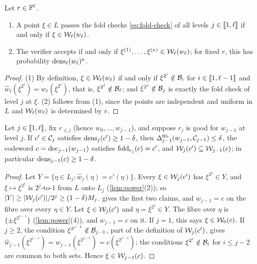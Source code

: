 \begin{lemma}\label{lem:passing}
Let $r \in \mathbb{F}^\ell$.
\begin{enumerate}
  \item A point $\xi \in L$ passes the fold checks \eqref{eq:fold-check} of all levels $j \in \llbracket 1, \ell \rrbracket$ if and only if $\xi \in \mathcal{W}_\ell(w_\ell)$.
  \item The verifier accepts if and only if $\xi^{(1)},\dots,\xi^{(\kappa)} \in \mathcal{W}_\ell(w_\ell)$; for fixed $r$, this has probability $\mathrm{dens}_\ell(w_\ell)^\kappa$.
\end{enumerate}
\end{lemma}

\begin{proof}
(1) By definition, $\xi \in \mathcal{W}_\ell(w_\ell)$ if and only if $\xi^{2^i} \notin \mathcal{B}_i$ for $i \in \llbracket 1, \ell-1 \rrbracket$ and $\hat w_\ell(\xi^{2^\ell}) = w_\ell(\xi^{2^\ell})$, that is, $\xi^{2^\ell} \notin \mathcal{B}_\ell$; and $\xi^{2^j} \notin \mathcal{B}_j$ is exactly the fold check of level $j$ at $\xi$.
(2) follows from (1), since the points are independent and uniform in $L$ and $\mathcal{W}_\ell(w_\ell)$ is determined by $r$.
\end{proof}

\begin{lemma}\label{lem:rbr-step}
Let $j \in \llbracket 1, \ell \rrbracket$, fix $r_{\le j}$ (hence $w_0, \dots, w_{j-1}$), and suppose $r_j$ is good for $w_{j-1}$ at level $j$.
If $c' \in \mathcal{C}_j$ satisfies $\mathrm{dens}_{j}(c') \ge 1-\delta$, then $\Delta^{\mathrm{fib}}_{j-1}(w_{j-1}, \mathcal{C}_{j-1}) \le \delta$, the codeword $c = \mathrm{dec}_{j-1}(w_{j-1})$ satisfies $\mathrm{fold}_{r_j}(c) = c'$, and $\mathcal{W}_{j}(c') \subseteq \mathcal{W}_{j-1}(c)$; in particular $\mathrm{dens}_{j-1}(c) \ge 1-\delta$.
\end{lemma}

\begin{proof}
Let $Y = \{\eta \in L_{j} : \hat w_j(\eta) = c'(\eta)\}$. Every $\xi \in \mathcal{W}_{j}(c')$ has $\xi^{2^j} \in Y$, and $\xi \mapsto \xi^{2^j}$ is $2^j$-to-$1$ from $L$ onto $L_j$ (\cref{lem:power}(2)); so $|Y| \ge |\mathcal{W}_j(c')|/2^j \ge (1-\delta)M_j$.
 gives the first two claims, and $w_{j-1} = c$ on the fibre over every $\eta \in Y$.
Let $\xi \in \mathcal{W}_{j}(c')$ and $\eta = \xi^{2^j} \in Y$. The fibre over $\eta$ is $\{\pm \xi^{2^{j-1}}\}$ (\cref{lem:power}(4)), and $w_{j-1} = c$ on it.
If $j = 1$, this says $\xi \in \mathcal{W}_0(c)$.
If $j \ge 2$, the condition $\xi^{2^{j-1}} \notin \mathcal{B}_{j-1}$, part of the definition of $\mathcal{W}_{j}(c')$, gives $\hat w_{j-1}(\xi^{2^{j-1}}) = w_{j-1}(\xi^{2^{j-1}}) = c(\xi^{2^{j-1}})$; the conditions $\xi^{2^i} \notin \mathcal{B}_i$ for $i \le j-2$ are common to both sets. Hence $\xi \in \mathcal{W}_{j-1}(c)$.
\end{proof}

